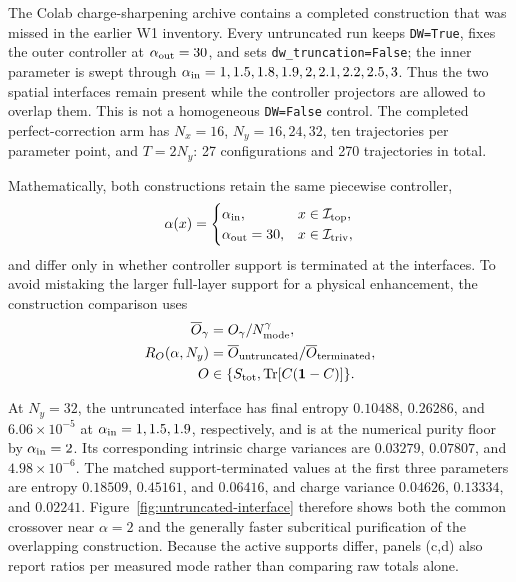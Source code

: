 \documentclass[aps,prb,twocolumn,floatfix,nofootinbib,superscriptaddress]{revtex4-2}
\newcommand{\Tr}{\operatorname{Tr}}
\begin{document}
The Colab charge-sharpening archive contains a completed construction that was missed in
the earlier W1 inventory.  Every untruncated run keeps \texttt{DW=True}, fixes the outer
controller at $\alpha_{\rm out}=30$, and sets \texttt{dw\_truncation=False}; the inner
parameter is swept through $\alpha_{\rm in}=1,1.5,1.8,1.9,2,2.1,2.2,2.5,3$.  Thus the
two spatial interfaces remain present while the controller projectors are allowed to
overlap them.  This is not a homogeneous \texttt{DW=False} control.  The completed
perfect-correction arm has $N_x=16$, $N_y=16,24,32$, ten trajectories per parameter
point, and $T=2N_y$: 27 configurations and 270 trajectories in total.

Mathematically, both constructions retain the same piecewise controller,
\begin{equation}
 \alpha(x)=
 \begin{cases}
  \alpha_{\rm in}, & x\in\mathcal I_{\rm top},\\
  \alpha_{\rm out}=30, & x\in\mathcal I_{\rm triv},
 \end{cases}
 \label{eq:overlap-alpha-profile}
\end{equation}
and differ only in whether controller support is terminated at the interfaces.  To avoid
mistaking the larger full-layer support for a physical enhancement, the construction
comparison uses
\begin{equation}
 \begin{aligned}
 \overline O_\gamma&=O_\gamma/N_{\rm mode}^\gamma,\\
 R_O(\alpha,N_y)&=\overline O_{\rm untruncated}/
                         \overline O_{\rm terminated},\\
 O&\in\{S_{\rm tot},\Tr[C(\mathbf{1}-C)]\}.
 \end{aligned}
 \label{eq:overlap-density-ratio}
\end{equation}

At $N_y=32$, the untruncated interface has final entropy $0.10488$, $0.26286$, and
$6.06\times10^{-5}$ at $\alpha_{\rm in}=1,1.5,1.9$, respectively, and is at the numerical
purity floor by $\alpha_{\rm in}=2$.  Its corresponding intrinsic charge variances are
$0.03279$, $0.07807$, and $4.98\times10^{-6}$.  The matched support-terminated values at
the first three parameters are entropy $0.18509$, $0.45161$, and $0.06416$, and charge
variance $0.04626$, $0.13334$, and $0.02241$.  Figure~\ref{fig:untruncated-interface}
therefore shows both the common crossover near $\alpha=2$ and the generally faster
subcritical purification of the overlapping construction.  Because the active supports
differ, panels (c,d) also report ratios per measured mode rather than comparing raw totals
alone.
\end{document}
